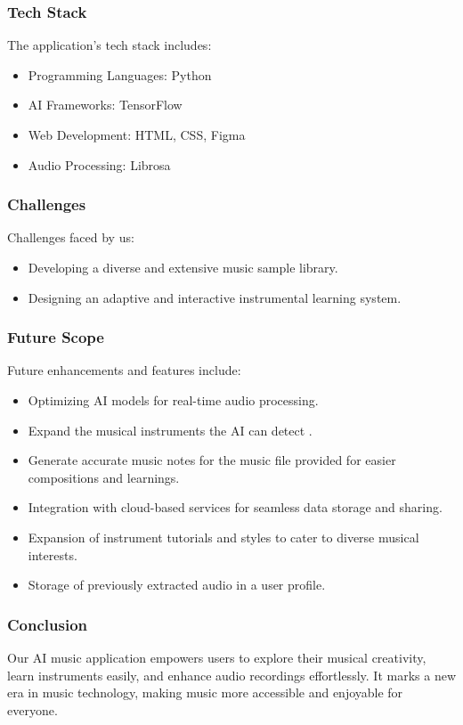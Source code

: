 \documentclass{beamer}
\begin{document}
\begin{frame}
  \frametitle{Tech Stack}
  The application's tech stack includes:
  \begin{itemize}
    \item Programming Languages: Python
    \item AI Frameworks: TensorFlow
    \item Web Development: HTML, CSS, Figma
    \item Audio Processing: Librosa
  \end{itemize}
\end{frame}


\begin{frame}
  \frametitle{Challenges}
  Challenges faced by us:
  \begin{itemize}
    \item Developing a diverse and extensive music sample library.
    \item Designing an adaptive and interactive instrumental learning system.
  \end{itemize}
\end{frame}

\begin{frame}
  \frametitle{Future Scope}
  Future enhancements and features include:
  \begin{itemize}
    \item Optimizing AI models for real-time audio processing.
    \item Expand the musical instruments the AI can detect .
    \item Generate accurate music notes for the music file provided for easier 
compositions and learnings.
    \item Integration with cloud-based services for seamless data storage and 
sharing.
    \item Expansion of instrument tutorials and styles to cater to diverse 
musical interests.
\item Storage of previously extracted audio in a user profile.
  \end{itemize}
\end{frame}

\begin{frame}
  \frametitle{Conclusion}
  Our AI music application empowers users to explore their musical creativity, 
learn instruments easily, and enhance audio recordings effortlessly. It marks 
a new era in music technology, making music more accessible and enjoyable for 
everyone.
\end{frame}

\end{document}
